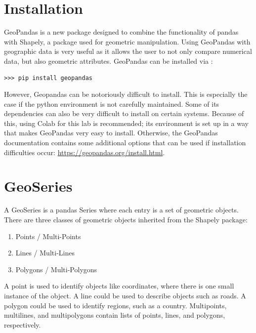 



\section*{Installation} %
GeoPandas is a new package designed to combine the functionality of pandas with Shapely, a package used for geometric manipulation.
Using GeoPandas with geographic data is very useful as it allows the user to not only compare numerical data, but also geometric attributes.
GeoPandas can be installed via :
\begin{lstlisting}
>>> pip install geopandas
\end{lstlisting}
However, Geopandas can be notoriously difficult to install.
This is especially the case if the python environment is not carefully maintained.
Some of its dependencies can also be very difficult to install on certain systems.
Because of this, using Colab for this lab is recommended; its environment is set up in a way that makes GeoPandas very easy to install.
Otherwise, the GeoPandas documentation contains some additional options that can be used if installation difficulties occur: \url{https://geopandas.org/install.html}.

\section*{GeoSeries} %

A GeoSeries is a pandas Series where each entry is a set of geometric objects.
There are three classes of geometric objects inherited from the Shapely package:
\begin{enumerate}
\item Points / Multi-Points
\item Lines / Multi-Lines
\item Polygons / Multi-Polygons
\end{enumerate}
A point is used to identify objects like coordinates, where there is one small instance of the object.
A line could be used to describe objects such as roads.
A polygon could be used to identify regions, such as a country.
Multipoints, multilines, and multipolygons contain lists of points, lines, and polygons, respectively.

